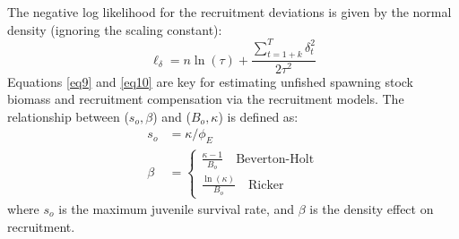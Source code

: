 The negative log likelihood for the recruitment deviations is given by the normal density (ignoring the scaling constant):
\begin{equation}\label{eq10}
 \ell_\delta = n\ln(\tau) + \frac{\sum_{t=1+k}^T \delta^2_t}{2\tau^2}
\end{equation}
Equations \eqref{eq9} and \eqref{eq10} are key for estimating unfished spawning stock biomass and recruitment compensation via the recruitment models.  The relationship between ($s_o,\beta$) and ($B_o,\kappa$) is defined as:
\begin{align}
s_o &= \kappa/\phi_E\\
\beta&=\begin{cases}
\frac{\kappa-1}{B_o} \quad \mbox{Beverton-Holt}\\[1ex]
\frac{\ln(\kappa)}{B_o} \quad \mbox{Ricker}
\end{cases}
\end{align}
where $s_o$ is the maximum juvenile survival rate, and $\beta$ is the density effect on recruitment.






